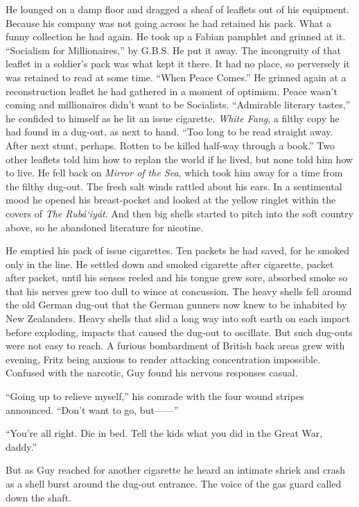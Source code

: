 He lounged on a damp floor and dragged a sheaf of leaflets out of his equipment. Because his company was not going across he had retained his pack. What a funny collection he had again. He took up a Fabian pamphlet and grinned at it. ``Socialism for Millionaires,'' by G.B.S. He put it away. The incongruity of that leaflet in a soldier's pack was what kept it there. It had no place, so perversely it was retained to read at some time. ``When Peace Comes.'' He grinned again at a reconstruction leaflet he had gathered in a moment of optimism. Peace wasn't coming and millionaires didn't want to be Socialists. ``Admirable literary tastes,'' he confided to himself as he lit an issue cigarette. \emph{White Fang}, a filthy copy he had found in a dug-out, as next to hand. ``Too long to be read straight away. After next stunt, perhaps. Rotten to be killed half-way through a book.'' Two other leaflets told him how to replan the world if he lived, but none told him how to live. He fell back on \emph{Mirror of the Sea}, which took him away for a time from the filthy dug-out. The fresh salt winds rattled about his ears. In a sentimental mood he opened his breast-pocket and looked at the yellow ringlet within the covers of \emph{The Rub\'{a}`iy\'{a}t}. And then big shells started to pitch into the soft country above, so he abandoned literature for nicotine.

He emptied his pack of issue cigarettes. Ten packets he had saved, for he smoked only in the line. He settled down and smoked cigarette after cigarette, packet after packet, until his senses reeled and his tongue grew sore, absorbed smoke so that his nerves grew too dull to wince at concussion. The heavy shells fell around the old German dug-out that the German gunners now knew to be inhabited by New Zealanders. Heavy shells that slid a long way into soft earth on each impact before exploding, impacts that caused the dug-out to oscillate. But such dug-outs were not easy to reach. A furious bombardment of British back areas grew with evening, Fritz being anxious to render attacking concentration impossible. Confused with the narcotic, Guy found his nervous responses casual.

``Going up to relieve myself,'' his comrade with the four wound stripes announced. ``Don't want to go, but------''

``You're all right. Die in bed. Tell the kids what you did in the Great War, daddy.''

But as Guy reached for another cigarette he heard an intimate shriek and crash as a shell burst around the dug-out entrance. The voice of the gas guard called down the shaft.

